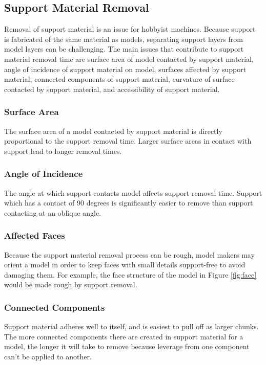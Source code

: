 \documentclass{sigchi}
\begin{document}
\subsection{Support Material Removal}
Removal of support material is an issue for hobbyist machines.  Because support is fabricated of the same material as models, separating support layers from model layers can be challenging.  The main issues that contribute to support material removal time are surface area of model contacted by support material, angle of incidence of support material on model, surfaces affected by support material, connected components of support material, curvature of surface contacted by support material, and accessibility of support material.

\subsubsection{Surface Area}
The surface area of a model contacted by support material is directly proportional to the support removal time.  Larger surface areas in contact with support lead to longer removal times.

\subsubsection{Angle of Incidence}
The angle at which support contacts model affects support removal time.  Support which has a contact of 90 degrees is significantly easier to remove than support contacting at an oblique angle.

\subsubsection{Affected Faces}
Because the support material removal process can be rough, model makers may orient a model in order to keep faces with small details support-free to avoid damaging them.  For example, the face structure of the model in Figure \ref{fig:face} would be made rough by support removal.

\subsubsection{Connected Components}
Support material adheres well to itself, and is easiest to pull off as larger chunks.  The more connected components there are created in support material for a model, the longer it will take to remove because leverage from one component can't be applied to another.
\end{document}
